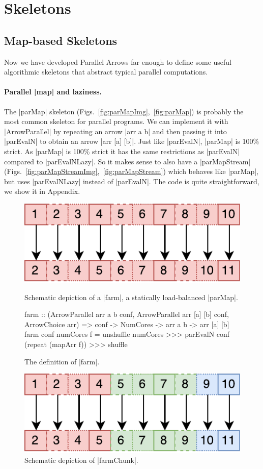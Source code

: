 \section{Skeletons}
\label{sec:skeletons}
\subsection{Map-based Skeletons}
\label{sec:map-skeletons}
Now we have developed Parallel Arrows far enough to define some useful algorithmic skeletons that abstract typical parallel computations.

\paragraph{Parallel |map| and laziness.}
The |parMap| skeleton (Figs.~\ref{fig:parMapImg},~\ref{fig:parMap}) is probably the most common skeleton for parallel programs. We can implement it with |ArrowParallel| by repeating an arrow |arr a b| and then passing it into |parEvalN| to obtain an arrow |arr [a] [b]|.
Just like |parEvalN|, |parMap| is 100\% strict.
As |parMap|  is 100\% strict it has the same restrictions as |parEvalN| compared to |parEvalNLazy|. So it makes sense to also have a |parMapStream| (Figs.~\ref{fig:parMapStreamImg},~\ref{fig:parMapStream}) which behaves like |parMap|, but uses |parEvalNLazy| instead of |parEvalN|. The code is quite straightforward, we show it in Appendix.

\begin{figure}[thb]
\includegraphics[scale=0.7]{images/farm}
\caption{Schematic depiction of a |farm|, a statically
      load-balanced |parMap|.}
\label{fig:farmImg}

\begin{code}
farm :: (ArrowParallel arr a b conf,
	ArrowParallel arr [a] [b] conf, ArrowChoice arr) =>
	conf -> NumCores -> arr a b -> arr [a] [b]
farm conf numCores f =
	unshuffle numCores >>>
	parEvalN conf (repeat (mapArr f)) >>>
	shuffle
\end{code}
\caption{The definition of |farm|.}
\label{fig:farm}

\includegraphics[scale=0.7]{images/farmChunk}
\caption{Schematic depiction of |farmChunk|.}
\label{fig:farmChunkImg}
\end{figure}

